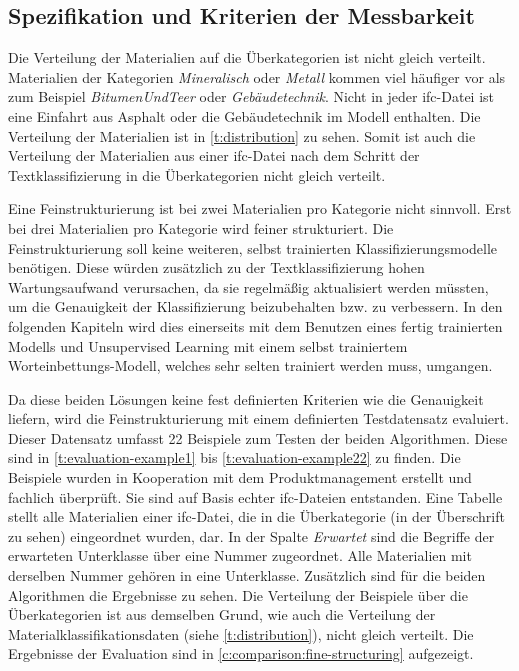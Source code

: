 \subsection{Spezifikation und Kriterien der Messbarkeit}
\label{c:conception:fine-structuring:criteria}
Die Verteilung der Materialien auf die Überkategorien ist nicht gleich verteilt. Materialien der Kategorien \textit{Mineralisch} oder \textit{Metall} kommen viel häufiger vor als zum Beispiel \textit{BitumenUndTeer} oder \textit{Gebäudetechnik}. Nicht in jeder \ac{ifc}-Datei ist eine Einfahrt aus Asphalt oder die Gebäudetechnik im Modell enthalten. Die Verteilung der Materialien ist in \autoref{t:distribution} zu sehen. Somit ist auch die Verteilung der Materialien aus einer \ac{ifc}-Datei nach dem Schritt der Textklassifizierung in die Überkategorien nicht gleich verteilt.

Eine Feinstrukturierung ist bei zwei Materialien pro Kategorie nicht sinnvoll. Erst bei drei Materialien pro Kategorie wird feiner strukturiert. Die Feinstrukturierung soll keine weiteren, selbst trainierten Klassifizierungsmodelle benötigen. Diese würden zusätzlich zu der Textklassifizierung hohen Wartungsaufwand verursachen, da sie regelmäßig aktualisiert werden müssten, um die Genauigkeit der Klassifizierung beizubehalten bzw. zu verbessern. In den folgenden Kapiteln wird dies einerseits mit dem Benutzen eines fertig trainierten Modells und Unsupervised Learning mit einem selbst trainiertem Worteinbettungs-Modell, welches sehr selten trainiert werden muss, umgangen.

Da diese beiden Lösungen keine fest definierten Kriterien wie die Genauigkeit liefern, wird die Feinstrukturierung mit einem definierten Testdatensatz evaluiert. Dieser Datensatz umfasst 22 Beispiele zum Testen der beiden Algorithmen. Diese sind in \autoref{t:evaluation-example1} bis \autoref{t:evaluation-example22} zu finden. Die Beispiele wurden in Kooperation mit dem Produktmanagement erstellt und fachlich überprüft. Sie sind auf Basis echter \ac{ifc}-Dateien entstanden. Eine Tabelle stellt alle Materialien einer \ac{ifc}-Datei, die in die Überkategorie (in der Überschrift zu sehen) eingeordnet wurden, dar. In der Spalte \textit{Erwartet} sind die Begriffe der erwarteten Unterklasse über eine Nummer zugeordnet. Alle Materialien mit derselben Nummer gehören in eine Unterklasse. Zusätzlich sind für die beiden Algorithmen die Ergebnisse zu sehen. Die Verteilung der Beispiele über die Überkategorien ist aus demselben Grund, wie auch die Verteilung der Materialklassifikationsdaten (siehe \autoref{t:distribution}), nicht gleich verteilt. Die Ergebnisse der Evaluation sind in \autoref{c:comparison:fine-structuring} aufgezeigt.

